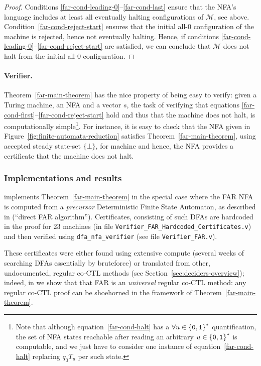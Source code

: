 \begin{proof}
    Conditions \eqref{far-cond-leading-0}--\eqref{far-cond-last} ensure that the NFA's language includes at least all eventually halting configurations of $\mathcal{M}$, see above. Condition~\eqref{far-cond-reject-start} ensures that the initial all-0 configuration of the machine is rejected, hence not eventually halting. Hence, if conditions \eqref{far-cond-leading-0}--\eqref{far-cond-reject-start} are satisfied, we can conclude that $\mathcal{M}$ does not halt from the initial all-0 configuration.
\end{proof}

\paragraph{Verifier.} Theorem~\ref{far-main-theorem} has the nice property of being easy to verify: given a Turing machine, an NFA and a vector $s$, the task of verifying that equations \eqref{far-cond-first}--\eqref{far-cond-reject-start} hold and thus that the machine does not halt, is computationally simple\footnote{Note that although equation~\eqref{far-cond-halt} has a $\forall u\in\left\{\texttt{0},\texttt{1}\right\}^*$ quantification, the set of NFA states reachable after reading an arbitrary $u \in \left\{\texttt{0},\texttt{1}\right\}^*$ is computable, and we just have to consider one instance of equation~\eqref{far-cond-halt} replacing $q_0 T_u$ per such state.}. For instance, it is easy to check that the NFA given in Figure~\ref{fig:finite-automata-reduction} satisfies Theorem~\ref{far-main-theorem}, using accepted steady state-set $\{\bot\}$, for machine  and hence, the NFA provides a certificate that the machine does not halt.



\subsubsection{Implementations and results}\label{sec:FAR:results}

\CoqBB implements Theorem~\ref{far-main-theorem} in the special case where the FAR NFA is computed from a \textit{precursor} Deterministic Finite State Automaton, as described in \cite{bbchallenge_part1} (``direct FAR algorithm''). Certificates, consisting of such DFAs are hardcoded in the proof for 23 machines (in file \texttt{Verifier\_FAR\_Hardcoded\_Certificates.v}) and then verified using \texttt{dfa\_nfa\_verifier} (see file \texttt{Verifier\_FAR.v}).

These certificates were either found using extensive compute (\eg several weeks of searching DFAs essentially by bruteforce) or translated from other, undocumented, regular co-CTL methods (see Section~\ref{sec:deciders-overview}); indeed, in \cite{bbchallenge_part1} we show that that FAR is an \textit{universal} regular co-CTL method: any regular co-CTL proof can be shoehorned in the framework of Theorem~\ref{far-main-theorem}.

